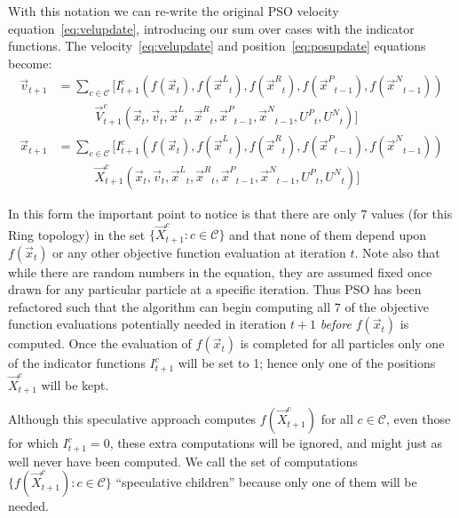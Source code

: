 \documentclass{llncs}
\newcommand{\parens}[1]{\!\left(#1\right)}
\providecommand{\pers}{\ensuremath{P}}
\providecommand{\neigh}{\ensuremath{N}}
\providecommand{\leftind}{\ensuremath{L}}
\providecommand{\rightind}{\ensuremath{R}}
\providecommand{\nURand}{\ensuremath{U^\neigh}}
\providecommand{\pURand}{\ensuremath{U^\pers}}
\providecommand{\ppos}{\ensuremath{\Vec{x}}}
\providecommand{\pvel}{\ensuremath{\Vec{v}}}
\providecommand{\nbest}{\ensuremath{\Vec{x}^\neigh}}
\providecommand{\pbest}{\ensuremath{\Vec{x}^\pers}}
\providecommand{\ofunc}{\ensuremath{f}}
\providecommand{\indic}{\ensuremath{I}}
\providecommand{\specvel}{\ensuremath{\vec{V}}}
\providecommand{\specpos}{\ensuremath{\vec{X}}}
\providecommand{\leftn}{\ensuremath{\Vec{x}^\leftind}}
\providecommand{\rightn}{\ensuremath{\Vec{x}^\rightind}}
\providecommand{\caseset}{\ensuremath{\mathcal{C}}}
\providecommand{\casegen}{\ensuremath{c}}
\begin{document}
With this notation we can re-write the original PSO velocity
equation~\eqref{eq:velupdate}, introducing our sum over cases with the
indicator functions.
The velocity~\eqref{eq:velupdate} and position~\eqref{eq:posupdate} equations become:
\begin{align}
\nonumber
  \pvel_{t+1} &= \sum_{c \in \caseset} \bigl[
	\indic_{t+1}^{c}\parens{
	  \ofunc\parens{\ppos_{t}},
	  \ofunc\parens{\leftn_{t}},
	  \ofunc\parens{\rightn_{t}},
	  \ofunc\parens{\pbest_{t-1}},
	  \ofunc\parens{\nbest_{t-1}}
	  } \\
\label{eq:specvelupdate}
	& \quad \quad \quad \specvel_{t+1}^{c}\parens{
	  \ppos_{t},
	  \pvel_{t},
	  \leftn_{t},
	  \rightn_{t},
	  \pbest_{t-1},
	  \nbest_{t-1},
	  \pURand_{t},
	  \nURand_{t}
	  }\bigr]
\\
\nonumber
  \ppos_{t+1} &= \sum_{c \in \caseset} \bigl[
	\indic_{t+1}^{c}\parens{
	  \ofunc\parens{\ppos_{t}},
	  \ofunc\parens{\leftn_{t}},
	  \ofunc\parens{\rightn_{t}},
	  \ofunc\parens{\pbest_{t-1}},
	  \ofunc\parens{\nbest_{t-1}}
	  } \\
\label{eq:specposupdate}
	& \quad \quad \quad \specpos_{t+1}^{c}\parens{
	  \ppos_{t},
	  \pvel_{t},
	  \leftn_{t},
	  \rightn_{t},
	  \pbest_{t-1},
	  \nbest_{t-1},
	  \pURand_{t},
	  \nURand_{t}
	  }\bigr]
\end{align}

In this form the important point to notice is that there are only $7$ values
(for this Ring topology) in the set $\{\specpos_{t+1}^{\casegen}: \casegen \in
\caseset\}$ and that none of them depend upon $f(\ppos_t)$ or any other
objective function evaluation at iteration $t$. Note also that while there are
random numbers in the equation, they are assumed fixed once drawn for any
particular particle at a specific iteration.  Thus PSO has been refactored such
that the algorithm can begin computing all $7$ of the objective function
evaluations potentially needed in iteration $t+1$ \emph{before} $f(\ppos_t)$ is
computed.  Once the evaluation of $f(\ppos_{t})$ is completed for all particles
only one of the indicator functions $\indic_{t+1}^{\casegen}$ will be set to 1;
hence only one of the positions $\specpos_{t+1}^\casegen$ will be kept.

Although this speculative approach computes
$\ofunc(\specpos_{t+1}^{\casegen})$ for all $\casegen \in \caseset$, even those
for which $\indic_{t+1}^{\casegen} = 0$, these extra computations will be
ignored, and might just as well never have been computed.  We call the set of
computations $\{\ofunc(\specpos_{t+1}^{c}) : \casegen \in \caseset\}$
``speculative children'' because only one of them will be needed.
\end{document}
